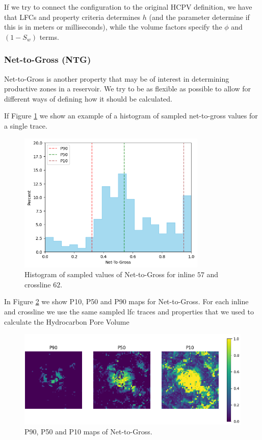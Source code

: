 \documentclass[note,screen,english,12pt,utf8]{nrdoc}
\begin{document}
If we try to connect the configuration to the original HCPV definition, we
have that LFCs and property criteria determines $h$ (and the 
parameter determine if this is in meters or milliseconds), while
the volume factors specify the $\phi$ and $(1 - S_w)$ terms.

\subsubsection{Net-to-Gross (NTG)}

Net-to-Gross is another property that may be of interest in determining
productive zones in a reservoir.
We try to be as flexible as possible to allow for different ways of
defining how it should be calculated.

If Figure \ref{fig:net_to_gross_histogram} we show an example of a histogram
of sampled net-to-gross values for a single trace.
\begin{figure}[h]
    \centering
    \includegraphics[width=0.8\textwidth]{figures/net_to_gross_il57_xl62.png}
    \caption{Histogram of sampled values of Net-to-Gross for inline $57$ and crossline $62$.}
    \label{fig:net_to_gross_histogram}
\end{figure}


In Figure \ref{fig:net_to_gross_maps} we show P10, P50 and P90 maps for
Net-to-Gross. For each inline and crossline we use the same sampled lfc
traces and properties that we used to calculate the Hydrocarbon Pore Volume

\begin{figure}[h]
    \centering
    \includegraphics[width=\textwidth]{figures/net_to_gross_p90_p50_p10.png}
    \caption{P90, P50 and P10 maps of Net-to-Gross.}
    \label{fig:net_to_gross_maps}
\end{figure}
\end{document}
